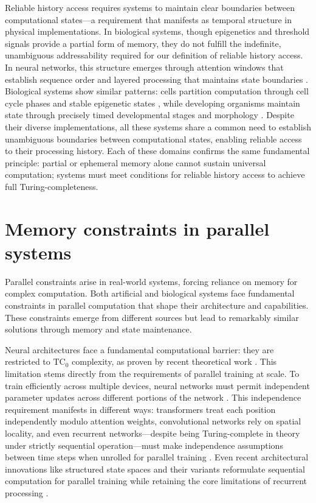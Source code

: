 \documentclass[12pt]{article}
\begin{document}
Reliable history access requires systems to maintain clear boundaries between computational states---a requirement that manifests as temporal structure in physical implementations.
In biological systems, though epigenetics and threshold signals provide a partial form of memory, they do not fulfill the indefinite, unambiguous addressability required for our definition of reliable history access.
In neural networks, this structure emerges through attention windows that establish sequence order and layered processing that maintains state boundaries \cite{martini2015information,quentin2019differential}.
Biological systems show similar patterns: cells partition computation through cell cycle phases and stable epigenetic states \cite{bruno2022epigenetic}, while developing organisms maintain state through precisely timed developmental stages and morphology \cite{turing1952chemical}.
Despite their diverse implementations, all these systems share a common need to establish unambiguous boundaries between computational states, enabling reliable access to their processing history.
Each of these domains confirms the same fundamental principle: partial or ephemeral memory alone cannot sustain universal computation; systems must meet conditions for reliable history access to achieve full Turing-completeness.

\section{Memory constraints in parallel systems}

Parallel constraints arise in real-world systems, forcing reliance on memory for complex computation.
Both artificial and biological systems face fundamental constraints in parallel computation that shape their architecture and capabilities.
These constraints emerge from different sources but lead to remarkably similar solutions through memory and state maintenance.

Neural architectures face a fundamental computational barrier: they are restricted to $\text{TC}_0$ complexity, as proven by recent theoretical work \cite{merrill2023parallelism,peng2024limitations}.
This limitation stems directly from the requirements of parallel training at scale.
To train efficiently across multiple devices, neural networks must permit independent parameter updates across different portions of the network \cite{barrett2019analyzing}.
This independence requirement manifests in different ways: transformers treat each position independently modulo attention weights, convolutional networks rely on spatial locality, and even recurrent networks---despite being Turing-complete in theory under strictly sequential operation---must make independence assumptions between time steps when unrolled for parallel training \cite{bengio2017deep}.
Even recent architectural innovations like structured state spaces and their variants reformulate sequential computation for parallel training while retaining the core limitations of recurrent processing \cite{gu2021efficiently,gu2023mamba,dao2024transformers,nguyen2024hyenadna}.
\end{document}
